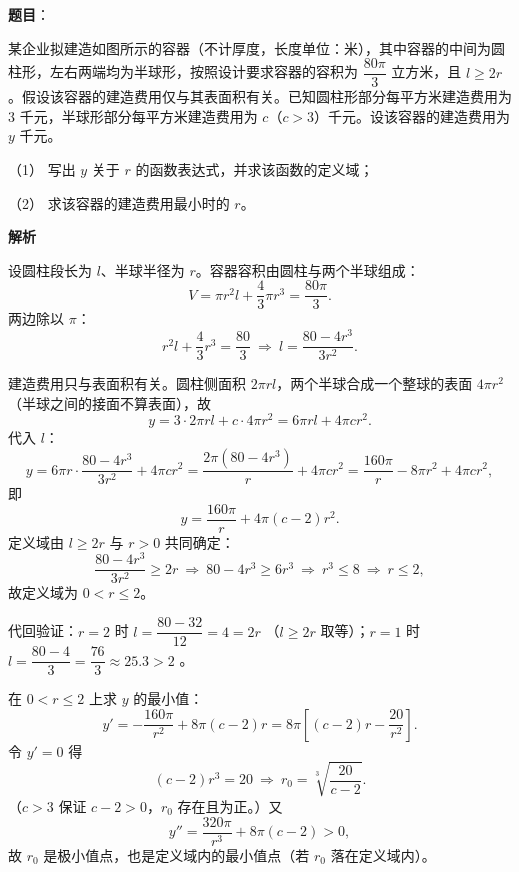 \begin{answer}

\textbf{题目}：

某企业拟建造如图所示的容器（不计厚度，长度单位：米），其中容器的中间为圆柱形，左右两端均为半球形，按照设计要求容器的容积为 $\dfrac{80\pi}{3}$ 立方米，且 $l\geqslant 2r$。假设该容器的建造费用仅与其表面积有关。已知圆柱形部分每平方米建造费用为 $3$ 千元，半球形部分每平方米建造费用为 $c$（$c>3$）千元。设该容器的建造费用为 $y$ 千元。

（1） 写出 $y$ 关于 $r$ 的函数表达式，并求该函数的定义域；

（2） 求该容器的建造费用最小时的 $r$。
\nopagebreak[4]
\begin{center}\end{center}
\nopagebreak[4]
\textbf{解析}

设圆柱段长为 $l$、半球半径为 $r$。容器容积由圆柱与两个半球组成：
\nopagebreak[4]
\[
V=\pi r^2l+\frac43\pi r^3=\frac{80\pi}{3}.
\]
两边除以 $\pi$：
\nopagebreak[4]
\[
r^2l+\frac43r^3=\frac{80}{3}\ \Longrightarrow\ l=\frac{80-4r^3}{3r^2}.
\]


建造费用只与表面积有关。圆柱侧面积 $2\pi rl$，两个半球合成一个整球的表面 $4\pi r^2$（半球之间的接面不算表面），故
\nopagebreak[4]
\[
y=3\cdot 2\pi rl+c\cdot4\pi r^2=6\pi rl+4\pi cr^2.
\]
代入 $l$：
\nopagebreak[4]
\[
y=6\pi r\cdot\frac{80-4r^3}{3r^2}+4\pi cr^2=\frac{2\pi(80-4r^3)}{r}+4\pi cr^2=\frac{160\pi}{r}-8\pi r^2+4\pi cr^2,
\]
即
\nopagebreak[4]
\[
y=\frac{160\pi}{r}+4\pi(c-2)r^2.
\]
定义域由 $l\geqslant2r$ 与 $r>0$ 共同确定：
\nopagebreak[4]
\[
\frac{80-4r^3}{3r^2}\geqslant2r\ \Longrightarrow\ 80-4r^3\geqslant6r^3\ \Longrightarrow\ r^3\leqslant8\ \Longrightarrow\ r\leqslant2,
\]
故定义域为 $0<r\leqslant2$。

代回验证：$r=2$ 时 $l=\dfrac{80-32}{12}=4=2r$ （$l\geqslant2r$ 取等）；$r=1$ 时 $l=\dfrac{80-4}{3}=\dfrac{76}{3}\approx25.3>2$ 。


在 $0<r\leqslant2$ 上求 $y$ 的最小值：
\nopagebreak[4]
\[
y'=-\frac{160\pi}{r^2}+8\pi(c-2)r=8\pi\left[(c-2)r-\frac{20}{r^2}\right].
\]
令 $y'=0$ 得
\nopagebreak[4]
\[
(c-2)r^3=20\ \Longrightarrow\ r_0=\sqrt[3]{\frac{20}{c-2}}.
\]
（$c>3$ 保证 $c-2>0$，$r_0$ 存在且为正。）又
\nopagebreak[4]
\[
y''=\frac{320\pi}{r^3}+8\pi(c-2)>0,
\]
故 $r_0$ 是极小值点，也是定义域内的最小值点（若 $r_0$ 落在定义域内）。


\end{answer}
